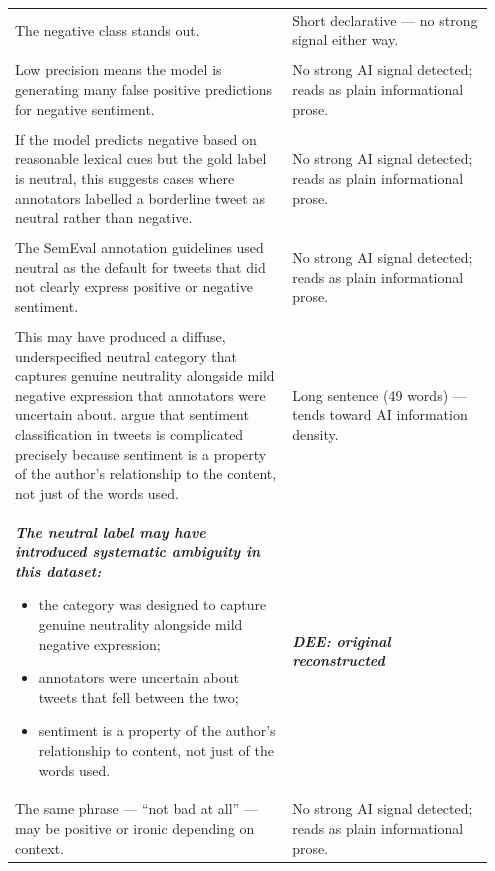 \documentclass[11pt]{article}
\begin{document}
\begin{longtable}{|p{0.55\linewidth}|p{0.40\linewidth}|}
\hline
\rule{0pt}{3.5cm} & \\
\hline
The negative class stands out. & Short declarative --- no strong signal either way. \\[2pt]
\hline
\rule{0pt}{3.5cm} & \\
\hline
Low precision means the model is generating many false positive predictions for negative sentiment. & No strong AI signal detected; reads as plain informational prose. \\[2pt]
\hline
\rule{0pt}{3.5cm} & \\
\hline
If the model predicts negative based on reasonable lexical cues but the gold label is neutral, this suggests cases where annotators labelled a borderline tweet as neutral rather than negative. & No strong AI signal detected; reads as plain informational prose. \\[2pt]
\hline
\rule{0pt}{3.5cm} & \\
\hline
The SemEval annotation guidelines used neutral as the default for tweets that did not clearly express positive or negative sentiment. & No strong AI signal detected; reads as plain informational prose. \\[2pt]
\hline
\rule{0pt}{3.5cm} & \\
\hline
This may have produced a diffuse, underspecified neutral category that captures genuine neutrality alongside mild negative expression that annotators were uncertain about. argue that sentiment classification in tweets is complicated precisely because sentiment is a property of the author's relationship to the content, not just of the words used. & Long sentence (49 words) --- tends toward AI information density. \\[2pt]
\hline
{\bfseries\itshape The neutral label may have introduced systematic ambiguity in this dataset:
\begin{itemize}[leftmargin=*,topsep=2pt,itemsep=1pt,parsep=0pt]
  \item the category was designed to capture genuine neutrality alongside mild negative expression;
  \item annotators were uncertain about tweets that fell between the two;
  \item sentiment is a property of the author's relationship to content, not just of the words used.\vspace{2em}
\end{itemize}} & \textbf{\textit{DEE: original reconstructed}} \\[2em]
\hline
The same phrase --- ``not bad at all'' --- may be positive or ironic depending on context. & No strong AI signal detected; reads as plain informational prose. \\[2pt]

\end{longtable}
\end{document}
